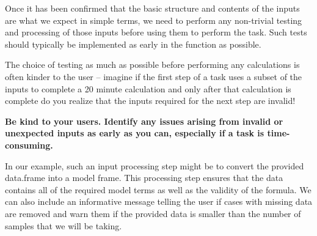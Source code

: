 \documentclass[
]{book}
\begin{document}
Once it has been confirmed that the basic structure and contents of the inputs are what we expect in simple terms, we need to perform any non-trivial testing and processing of those inputs before using them to perform the task. Such tests should typically be implemented as early in the function as possible.

The choice of testing as much as possible before performing any calculations is often kinder to the user -- imagine if the first step of a task uses a subset of the inputs to complete a 20 minute calculation and only after that calculation is complete do you realize that the inputs required for the next step are invalid!

\textbf{Be kind to your users. Identify any issues arising from invalid or unexpected inputs as early as you can, especially if a task is time-consuming.}

In our example, such an input processing step might be to convert the provided data.frame into a model frame. This processing step ensures that the data contains all of the required model terms as well as the validity of the formula. We can also include an informative message telling the user if cases with missing data are removed and warn them if the provided data is smaller than the number of samples that we will be taking.
\end{document}
